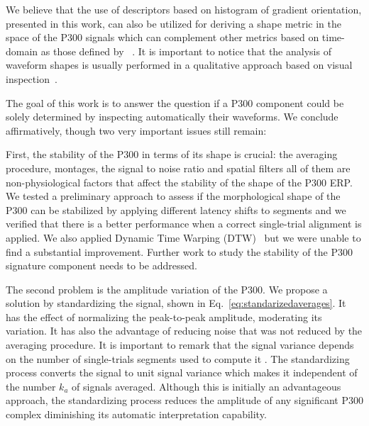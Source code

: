 \documentclass[utf8]{frontiersSCNS} %
\begin{document}
We believe that the use of descriptors based on histogram of gradient orientation, presented in this work, can also be utilized for deriving a shape metric in the space of the P300 signals which can complement other metrics based on time-domain as those defined by ~\cite{Mak2012}. It is important to notice that the analysis of waveform shapes is usually performed in a qualitative approach based on visual inspection~\citep{SellersandEmanuelDonchin2006}.

The goal of this work is to answer the question if a P300 component could be solely determined by inspecting automatically their waveforms.  We conclude affirmatively, though two very important issues still remain:

First, the stability of the P300 in terms of its shape is crucial: the averaging procedure, montages, the signal to noise ratio and spatial filters all of them are non-physiological factors that affect the stability of the shape of the P300 ERP.  We tested a preliminary approach to assess if the morphological shape of the P300 can be stabilized by applying different latency shifts to segments and we verified that there is a better performance when a correct single-trial alignment is applied.  We also applied Dynamic Time Warping (DTW)~\citep{Casarotto2005} but we were unable to find a substantial improvement.  Further work to study the stability of the P300 signature component needs to be addressed.

The second problem is the amplitude variation of the P300. We propose a solution by standardizing the signal, shown in Eq.~\ref{eq:standarizedaverages}. It has the effect of normalizing the peak-to-peak amplitude, moderating its variation. It has also the advantage of reducing noise that was not reduced by the averaging procedure.   It is important to remark that the signal variance depends on the number of single-trials segments used to compute it \citep{van2006signal}.  The standardizing process converts the signal to unit signal variance which makes it independent of the number $k_a$ of signals averaged.   Although this is initially an advantageous approach, the standardizing process reduces the amplitude of any significant P300 complex diminishing its automatic interpretation capability.
\end{document}
